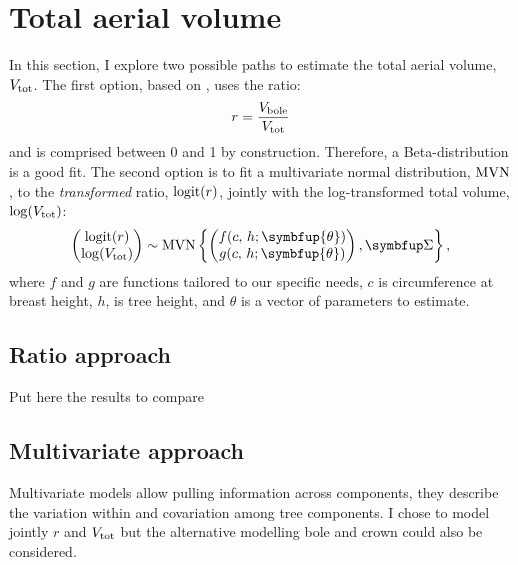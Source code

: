 \chapter{Total aerial volume\label{chap::total_v}}

In this section, I explore two possible paths to estimate the total aerial volume, \( V_{\text{tot}} \). The first option, based on \cite{Longuetaud2013}, uses the ratio:
\begin{equation}
	r = \frac{V_{\text{bole}}}{V_{\text{tot}}} \label{eq::r_boletot}
\end{equation}
and is comprised between 0 and 1 by construction. Therefore, a Beta-distribution is a good fit. The second option is to fit a multivariate normal distribution, \( \operatorname{MVN} \), to the \textit{transformed} ratio, \( \operatorname{logit}(r) \), jointly with the log-transformed total volume, \( \log(V_{\text{tot}}) \):
\begin{equation}
	\begin{pmatrix}
		\logit(r) \\
		\log(\Vtot)
	\end{pmatrix}
	\sim
	\MVN\left\{ \begin{pmatrix}
		f(c, \, h; \symbfup{\theta}) \\
		g(c, \, h; \symbfup{\theta}) \\
	\end{pmatrix}, \Sigmabf \right\},
	\label{eq::mvn}
\end{equation}
where \( f \) and \( g \) are functions tailored to our specific needs, \( c \) is circumference at breast height, \( h \), is tree height, and \( \theta \) is a vector of parameters to estimate.

\section{Ratio approach}

Put here the results to compare

\section{Multivariate approach}

Multivariate models allow pulling information across components, \ie they describe the variation within and covariation among tree components. I chose to model jointly \( r \) and \( V_{\text{tot}} \) but the alternative modelling bole and crown could also be considered.

